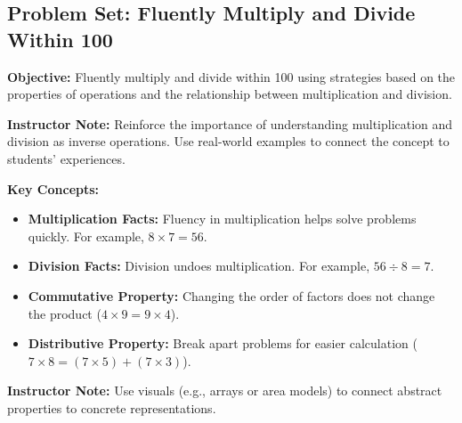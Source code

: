 \documentclass[12pt]{article}
\title{}
\date{}
\begin{document}
\subsection*{Problem Set: Fluently Multiply and Divide Within 100}
\onehalfspacing

\begin{tcolorbox}[colframe=black!40, colback=gray!5, 
coltitle=black, colbacktitle=black!20, fonttitle=\bfseries\Large, 
title=Learning Objective, halign title=center, left=5pt, right=5pt, top=5pt, bottom=15pt]
\textbf{Objective:} Fluently multiply and divide within 100 using strategies based on the properties of operations and the relationship between multiplication and division.

{\color{blue}\textbf{Instructor Note:} Reinforce the importance of understanding multiplication and division as inverse operations. Use real-world examples to connect the concept to students' experiences.}
\end{tcolorbox}

\vspace{1cm}

\begin{tcolorbox}[colframe=black!60, colback=white, 
coltitle=black, colbacktitle=black!15, fonttitle=\bfseries\Large, 
title=Key Concepts and Vocabulary, halign title=center, left=10pt, right=10pt, top=10pt, bottom=15pt]
\textbf{Key Concepts:}
\begin{itemize}
    \item \textbf{Multiplication Facts:} Fluency in multiplication helps solve problems quickly. For example, \(8 \times 7 = 56\).
    \item \textbf{Division Facts:} Division undoes multiplication. For example, \(56 \div 8 = 7\).
    \item \textbf{Commutative Property:} Changing the order of factors does not change the product (\(4 \times 9 = 9 \times 4\)).
    \item \textbf{Distributive Property:} Break apart problems for easier calculation (\(7 \times 8 = (7 \times 5) + (7 \times 3)\)).
\end{itemize}
{\color{blue}\textbf{Instructor Note:} Use visuals (e.g., arrays or area models) to connect abstract properties to concrete representations.}
\end{tcolorbox}

\vspace{1em}
\end{document}
